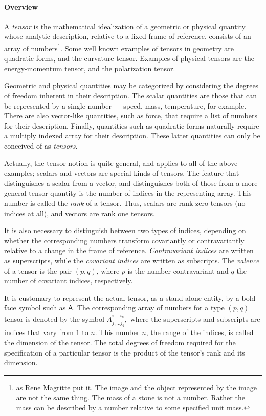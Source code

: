 \documentclass[12pt]{article}
\newcommand{\bA}{\mathsf{A}}
\begin{document}
\paragraph{Overview}
A \emph{tensor} is the mathematical idealization of a geometric or
physical quantity whose analytic description, relative to a fixed
frame of reference, consists of an array of numbers\footnote{ as Rene Magritte put it.  The image and the
  object represented by the image are not the same thing.  The mass of
  a stone is not a number.  Rather the mass can be described by a
  number relative to some specified unit mass.}.  Some well known
examples of tensors in geometry are quadratic forms, and the curvature
tensor.  Examples of physical tensors are the energy-momentum tensor,
and the polarization tensor.

Geometric and physical quantities may be categorized by considering
the degrees of freedom inherent in their description.  The scalar
quantities are those that can be represented by a single number ---
speed, mass, temperature, for example.  There are also vector-like
quantities, such as force, that require a list of numbers for their
description.  Finally, quantities such as quadratic forms
naturally require a multiply indexed array for their description.
These latter quantities can only be conceived of as \emph{tensors}.

Actually, the tensor notion is quite general, and applies to all of
the above examples; scalars and vectors are  special kinds of
tensors.  The feature that distinguishes a scalar from a vector, and
distinguishes both of those from a more general tensor quantity is
the number of indices in the representing array.  This number is
called the \emph{rank} of a tensor.  Thus, scalars are rank zero tensors (no
indices at all), and vectors are rank one tensors.

It is also necessary to distinguish between two types of indices,
depending on whether the corresponding numbers transform covariantly
or contravariantly relative to a change in the frame of reference.
\emph{Contravariant indices} are written as superscripts, while the
\emph{covariant indices} are written as subscripts.  The \emph{valence}
of a tensor is the pair $(p,q)$, where $p$ is the number contravariant
and $q$ the number of covariant indices, respectively.

It is customary to represent the actual tensor, as a stand-alone
entity, by a bold-face symbol such as $\bA$.  The corresponding array
of numbers for a type $(p,q)$ tensor is denoted by the symbol
$A^{i_1\ldots i_p}_{j_1\ldots j_q},$ where the superscripts and
subscripts are indices that vary from $1$ to $n$. This number $n$, the
range of the indices, is called the dimension of the tensor.  The
total degrees of freedom required for the specification of a
particular tensor is the product of the tensor's rank and its dimension.
\end{document}

